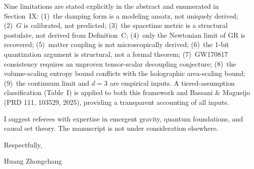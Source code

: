 \documentclass[12pt]{article}
\begin{document}
Nine limitations are stated explicitly in the abstract and enumerated in Section~IX: (1)~the damping form is a modeling ansatz, not uniquely derived; (2)~$G$ is calibrated, not predicted; (3)~the spacetime metric is a structural postulate, not derived from Definition~C; (4)~only the Newtonian limit of GR is recovered; (5)~matter coupling is not microscopically derived; (6)~the 1-bit quantization argument is structural, not a formal theorem; (7)~GW170817 consistency requires an unproven tensor-scalar decoupling conjecture; (8)~the volume-scaling entropy bound conflicts with the holographic area-scaling bound; (9)~the continuum limit and $d=3$ are empirical inputs. A tiered-assumption classification (Table~I) is applied to both this framework and Bassani \& Magueijo (PRD 111, 103529, 2025), providing a transparent accounting of all inputs.

I suggest referees with expertise in emergent gravity, quantum foundations, and causal set theory. The manuscript is not under consideration elsewhere.

\vspace{0.15in}
\noindent Respectfully,

\vspace{0.3in}
\noindent Huang Zhongchang
\end{document}
